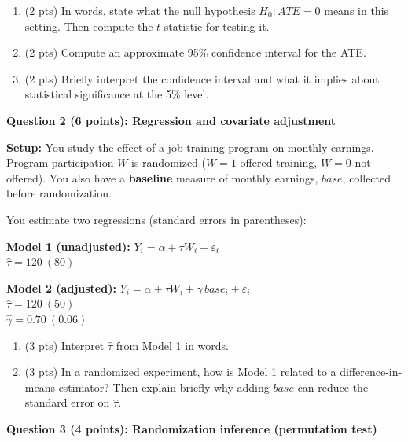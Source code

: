 \documentclass[12pt]{article}
\begin{document}
\begin{enumerate}[label=1\alph*)]
  \item (2 pts) In words, state what the null hypothesis $H_0: ATE=0$ means in this setting.
  Then compute the $t$-statistic for testing it.
  \item (2 pts) Compute an approximate 95\% confidence interval for the ATE.
  \item (2 pts) Briefly interpret the confidence interval and what it implies about statistical significance at the 5\% level.
\end{enumerate}

\vspace{1.0em}
\noindent\textbf{Question 2 (6 points): Regression and covariate adjustment}

\noindent\textbf{Setup:} You study the effect of a job-training program on monthly earnings.
Program participation $W$ is randomized ($W=1$ offered training, $W=0$ not offered). You also have a \textbf{baseline} measure
of monthly earnings, $base$, collected before randomization.

\vspace{0.5em}
\noindent You estimate two regressions (standard errors in parentheses):

\vspace{0.25em}
\noindent\textbf{Model 1 (unadjusted):} $Y_i=\alpha + \tau W_i + \varepsilon_i$ \\
$\hat\tau=120\ (80)$

\vspace{0.5em}
\noindent\textbf{Model 2 (adjusted):} $Y_i=\alpha + \tau W_i + \gamma\, base_i + \varepsilon_i$ \\
$\hat\tau=120\ (50)$ \\
$\hat\gamma=0.70\ (0.06)$

\vspace{0.75em}
\begin{enumerate}[label=2\alph*)]
  \item (3 pts) Interpret $\hat\tau$ from Model 1 in words.

  \vspace{0.5em}
  \item (3 pts) In a randomized experiment, how is Model 1 related to a difference-in-means estimator?
  Then explain briefly why adding $base$ can reduce the standard error on $\hat\tau$.
\end{enumerate}

\vspace{1.0em}
\noindent\textbf{Question 3 (4 points): Randomization inference (permutation test)}
\end{document}
